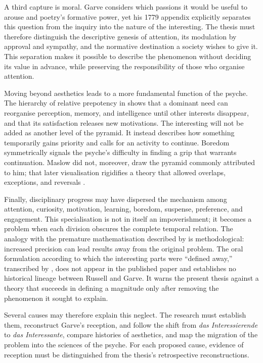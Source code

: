 \documentclass[11pt,a4paper]{article}
\begin{document}
A third capture is moral. Garve considers which passions it would be useful to
arouse and poetry's formative power, yet his 1779 appendix explicitly separates
this question from the inquiry into the nature of the interesting. The thesis
must therefore distinguish the descriptive genesis of attention, its modulation
by approval and sympathy, and the normative destination a society wishes to give
it. This separation makes it possible to describe the phenomenon without
deciding its value in advance, while preserving the responsibility of those who
organise attention.

Moving beyond aesthetics leads to a more fundamental function of the psyche.
The hierarchy of relative prepotency in \textcite{maslow1943motivation} shows
that a dominant need can reorganise perception, memory, and intelligence until
other interests disappear, and that its satisfaction releases new motivations.
The interesting will not be added as another level of the pyramid. It instead
describes how something temporarily gains priority and calls for an activity to
continue. Boredom
symmetrically signals the psyche's difficulty in finding a grip that warrants
continuation. Maslow did not, moreover, draw the pyramid commonly attributed to
him; that later visualisation rigidifies a theory that allowed overlaps,
exceptions, and reversals \parencite{bridgman2019maslow}.

Finally, disciplinary progress may have dispersed the mechanism among attention,
curiosity, motivation, learning, boredom, suspense, preference, and engagement.
This specialisation is not in itself an impoverishment; it becomes a problem
when each division obscures the complete temporal relation. The analogy with
the premature mathematisation described by \textcite{russell1995rationality} is
methodological: increased precision can lead results away from the original
problem. The oral formulation according to which the interesting parts were
``defined away,'' transcribed by \textcite{pachet1997representation}, does not
appear in the published paper and establishes no historical lineage between
Russell and Garve. It warns the present thesis against a theory that succeeds in
defining a magnitude only after removing the phenomenon it sought to explain.

Several causes may therefore explain this neglect. The research must establish
them, reconstruct Garve's reception, and follow the shift
from \emph{das Interessierende} to \emph{das Interessante}, compare histories of
aesthetics, and map the migration of the problem into the sciences of the
psyche. For each proposed cause, evidence of reception must be distinguished
from the thesis's retrospective reconstructions.
\end{document}

